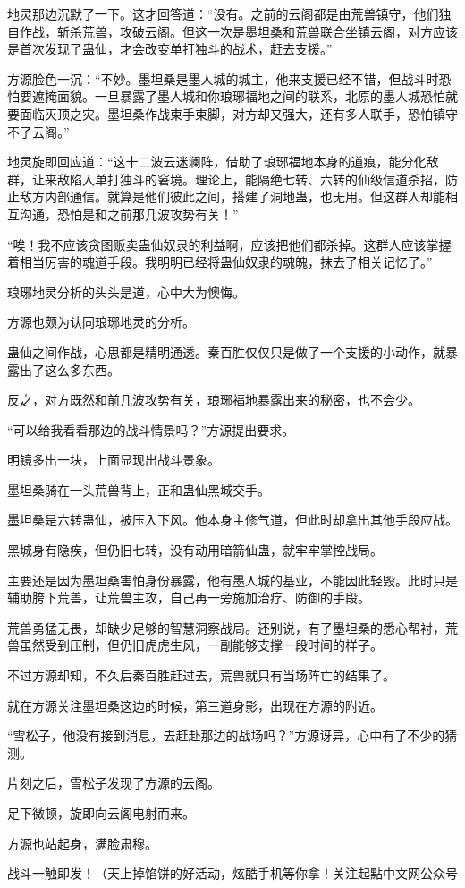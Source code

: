 \begin{this_body}
地灵那边沉默了一下。这才回答道：“没有。之前的云阁都是由荒兽镇守，他们独自作战，斩杀荒兽，攻破云阁。但这一次是墨坦桑和荒兽联合坐镇云阁，对方应该是首次发现了蛊仙，才会改变单打独斗的战术，赶去支援。”

方源脸色一沉：“不妙。墨坦桑是墨人城的城主，他来支援已经不错，但战斗时恐怕要遮掩面貌。一旦暴露了墨人城和你琅琊福地之间的联系，北原的墨人城恐怕就要面临灭顶之灾。墨坦桑作战束手束脚，对方却又强大，还有多人联手，恐怕镇守不了云阁。”

地灵旋即回应道：“这十二波云迷澜阵，借助了琅琊福地本身的道痕，能分化敌群，让来敌陷入单打独斗的窘境。理论上，能隔绝七转、六转的仙级信道杀招，防止敌方内部通信。就算是他们彼此之间，搭建了洞地蛊，也无用。但这群人却能相互沟通，恐怕是和之前那几波攻势有关！”

“唉！我不应该贪图贩卖蛊仙奴隶的利益啊，应该把他们都杀掉。这群人应该掌握着相当厉害的魂道手段。我明明已经将蛊仙奴隶的魂魄，抹去了相关记忆了。”

琅琊地灵分析的头头是道，心中大为懊悔。

方源也颇为认同琅琊地灵的分析。

蛊仙之间作战，心思都是精明通透。秦百胜仅仅只是做了一个支援的小动作，就暴露出了这么多东西。

反之，对方既然和前几波攻势有关，琅琊福地暴露出来的秘密，也不会少。

“可以给我看看那边的战斗情景吗？”方源提出要求。

明镜多出一块，上面显现出战斗景象。

墨坦桑骑在一头荒兽背上，正和蛊仙黑城交手。

墨坦桑是六转蛊仙，被压入下风。他本身主修气道，但此时却拿出其他手段应战。

黑城身有隐疾，但仍旧七转，没有动用暗箭仙蛊，就牢牢掌控战局。

主要还是因为墨坦桑害怕身份暴露，他有墨人城的基业，不能因此轻毁。此时只是辅助胯下荒兽，让荒兽主攻，自己再一旁施加治疗、防御的手段。

荒兽勇猛无畏，却缺少足够的智慧洞察战局。还别说，有了墨坦桑的悉心帮衬，荒兽虽然受到压制，但仍旧虎虎生风，一副能够支撑一段时间的样子。

不过方源却知，不久后秦百胜赶过去，荒兽就只有当场阵亡的结果了。

就在方源关注墨坦桑这边的时候，第三道身影，出现在方源的附近。

“雪松子，他没有接到消息，去赶赴那边的战场吗？”方源讶异，心中有了不少的猜测。

片刻之后，雪松子发现了方源的云阁。

足下微顿，旋即向云阁电射而来。

方源也站起身，满脸肃穆。

战斗一触即发！（天上掉馅饼的好活动，炫酷手机等你拿！关注起點中文网公众号

\end{this_body}


